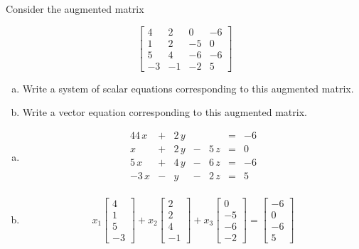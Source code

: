 
\begin{exerciseStatement}


 Consider the augmented matrix 

\[ \left[\begin{array}{ccc|c}
4 & 2 & 0 & -6 \\
1 & 2 & -5 & 0 \\
5 & 4 & -6 & -6 \\
-3 & -1 & -2 & 5
\end{array}\right] \]
\begin{enumerate}[(a)]
\item  Write a system of scalar equations corresponding to this augmented matrix. 
\item  Write a vector equation corresponding to this augmented matrix. 
\end{enumerate}
    
\end{exerciseStatement}
    
\begin{exerciseAnswer} 

\begin{enumerate}[(a)]
\item 
\begin{alignat*}{4} 4 \, x &+& 2 \, y & &  &=& -6 \\x &+& 2 \, y &-& 5 \, z &=& 0 \\5 \, x &+& 4 \, y &-& 6 \, z &=& -6 \\-3 \, x &-& y &-& 2 \, z &=& 5 \\ \end{alignat*}
            
\item \[ x_{1} \left[\begin{array}{c}
4 \\
1 \\
5 \\
-3
\end{array}\right] + x_{2} \left[\begin{array}{c}
2 \\
2 \\
4 \\
-1
\end{array}\right] + x_{3} \left[\begin{array}{c}
0 \\
-5 \\
-6 \\
-2
\end{array}\right] = \left[\begin{array}{c}
-6 \\
0 \\
-6 \\
5
\end{array}\right] \]
\end{enumerate}
    
\end{exerciseAnswer}
    
